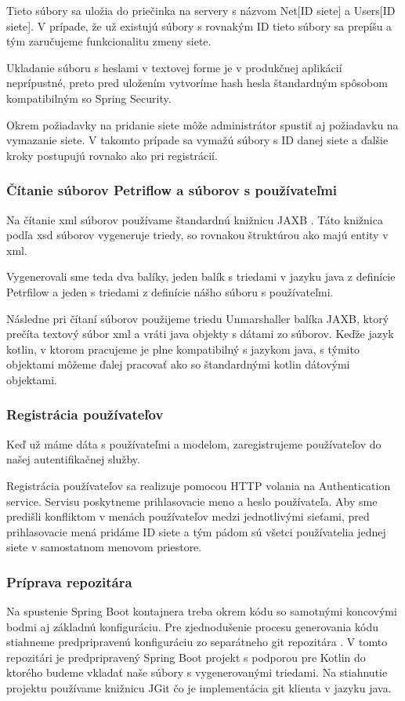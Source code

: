 Tieto súbory sa uložia do priečinka na servery s názvom Net[ID siete] a Users[ID siete]. V prípade, že už existujú súbory s rovnakým ID tieto súbory sa prepíšu a tým zaručujeme funkcionalitu zmeny siete.

Ukladanie súboru s heslami v textovej forme je v produkčnej aplikácií neprípustné, preto pred uložením vytvoríme hash hesla štandardným spôsobom kompatibilným so Spring Security.

Okrem požiadavky na pridanie siete môže administrátor spustiť aj požiadavku na vymazanie siete. V takomto prípade sa vymažú súbory s ID danej siete a ďalšie kroky postupujú rovnako ako pri registrácií.

\subsubsection{Čítanie súborov Petriflow a súborov s používateľmi}
Na čítanie \acrshort{xml} súborov používame štandardnú knižnicu JAXB \cite{jaxb}. Táto knižnica podľa \acrshort{xsd} súborov vygeneruje triedy, so rovnakou štruktúrou ako majú entity v \acrshort{xml}.

Vygenerovali sme teda dva balíky, jeden balík s triedami v jazyku java z definície Petrfilow a jeden s triedami z definície nášho súboru s používateľmi.

Následne pri čítaní súborov použijeme triedu Unmarshaller balíka JAXB, ktorý prečíta textový súbor \acrshort{xml} a vráti java objekty s dátami zo súborov. Keďže jazyk kotlin, v ktorom pracujeme je plne kompatibilný s jazykom java, s týmito objektami môžeme ďalej pracovať ako so štandardnými kotlin dátovými objektami.

\subsubsection{Registrácia používateľov}
Keď už máme dáta s používateľmi a modelom, zaregistrujeme používateľov do našej autentifikačnej služby.

Registrácia používateľov sa realizuje pomocou HTTP volania na Authentication service. Servisu poskytneme prihlasovacie meno a heslo používateľa. Aby sme predišli konfliktom v menách používateľov medzi jednotlivými sieťami, pred prihlasovacie mená pridáme ID siete a tým pádom sú všetci používatelia jednej siete v samostatnom menovom priestore.

\subsubsection{Príprava repozitára}
Na spustenie Spring Boot kontajnera treba okrem kódu so samotnými koncovými bodmi aj základnú konfiguráciu. Pre zjednodušenie procesu generovania kódu stiahneme predpripravenú konfiguráciu zo separátneho git repozitára \cite{dp_relay}. V tomto repozitári je predpripravený Spring Boot projekt s podporou pre Kotlin do ktorého budeme vkladať naše súbory s vygenerovanými triedami. Na stiahnutie projektu používame knižnicu JGit \cite{jgit} čo je implementácia git klienta v jazyku java.

